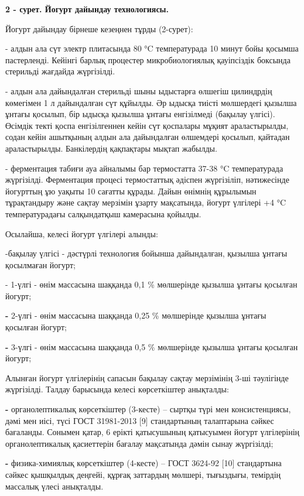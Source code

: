 {\bfseries 2 - сурет. Йогурт дайындау технологиясы.}

\begin{multicols}{2}
Йогурт дайындау бірнеше кезеңнен тұрды (2-сурет):

- алдын ала сүт электр плитасында 80 °C температурада 10 минут бойы
қосымша пастерленді. Кейінгі барлық процестер микробиологиялық
қауіпсіздік боксында стерильді жағдайда жүргізілді.

- алдын ала дайындалған стерильді шыны ыдыстарға өлшегіш цилиндрдің
көмегімен 1 л дайындалған сүт құйылды. Әр ыдысқа тиісті мөлшердегі
қызылша ұнтағы қосылып, бір ыдысқа қызылша ұнтағы енгізілмеді (бақылау
үлгісі). Өсімдік текті қоспа енгізілгеннен кейін сүт қоспалары мұқият
араластырылды, содан кейін ашытқының алдын ала дайындалған өлшемдері
қосылып, қайтадан араластырылды. Банкілердің қақпақтары мықтап жабылды.

- ферментация табиғи ауа айналымы бар термостатта 37-38 °C температурада
жүргізілді. Ферментация процесі термостаттық әдіспен жүргізіліп,
нәтижесінде йогурттың ұю уақыты 10 сағатты құрады. Дайын өнімнің
құрылымын тұрақтандыру және сақтау мерзімін ұзарту мақсатында, йогурт
үлгілері +4 °C температурадағы салқындатқыш камерасына қойылды.

Осылайша, келесі йогурт үлгілері алынды:

-бақылау үлгісі - дәстүрлі технология бойынша дайындалған, қызылша
ұнтағы қосылмаған йогурт;

- 1-үлгі - өнім массасына шаққанда 0,1 \% мөлшерінде қызылша ұнтағы
қосылған йогурт;

{\bfseries -} 2-үлгі - өнім массасына шаққанда 0,25 \% мөлшерінде қызылша
ұнтағы қосылған йогурт;

{\bfseries -} 3-үлгі - өнім массасына шаққанда 0,5 \% мөлшерінде қызылша
ұнтағы қосылған йогурт;

Алынған йогурт үлгілерінің сапасын бақылау сақтау мерзімінің 3-ші
тәулігінде жүргізілді. Талдау барысында келесі көрсеткіштер анықталды:

{\bfseries -} органолептикалық көрсеткіштер (3-кесте) -- сыртқы түрі мен
консистенциясы, дәмі мен иісі, түсі ГОСТ 31981-2013 {[}9{]} стандартының
талаптарына сәйкес бағаланды. Сонымен қатар, 6 ерікті қатысушының
қатысуымен йогурт үлгілерінің органолептикалық қасиеттерін бағалау
мақсатында дәмін сынау жүргізілді;

{\bfseries -} физика-химиялық көрсеткіштер (4-кесте) -- ГОСТ 3624-92
{[}10{]} стандартына сәйкес қышқылдық деңгейі, құрғақ заттардың мөлшері,
тығыздығы, темірдің массалық үлесі анықталды.


\end{multicols}
